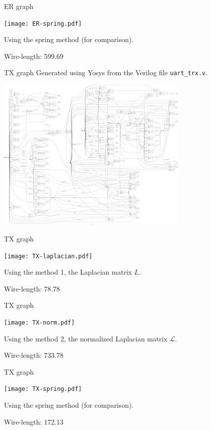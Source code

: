 \documentclass[serif, 12pt]{beamer}
\begin{document}
\begin{frame}{ER graph}
\begin{center}
\texttt{[image: ER-spring.pdf]}
\end{center}
Using the spring method (for comparison).

Wire-length: 599.69
\end{frame}

\begin{frame}{TX graph}
Generated using Yosys \cite{wolf} from the Verilog file \texttt{uart\_trx.v}.
\begin{center}
\includegraphics[width=0.7\textwidth]{uart-small.png}
\end{center}
\end{frame}

\begin{frame}{TX graph}
\begin{center}
\texttt{[image: TX-laplacian.pdf]}
\end{center}
Using the method 1, the Laplacian matrix $L$.

Wire-length: 78.78
\end{frame}

\begin{frame}{TX graph}
\begin{center}
\texttt{[image: TX-norm.pdf]}
\end{center}
Using the method 2, the normalized Laplacian matrix $\mathcal L$.

Wire-length: 733.78
\end{frame}

\begin{frame}{TX graph}
\begin{center}
\texttt{[image: TX-spring.pdf]}
\end{center}
Using the spring method (for comparison).

Wire-length: 172.13
\end{frame}
\end{document}
